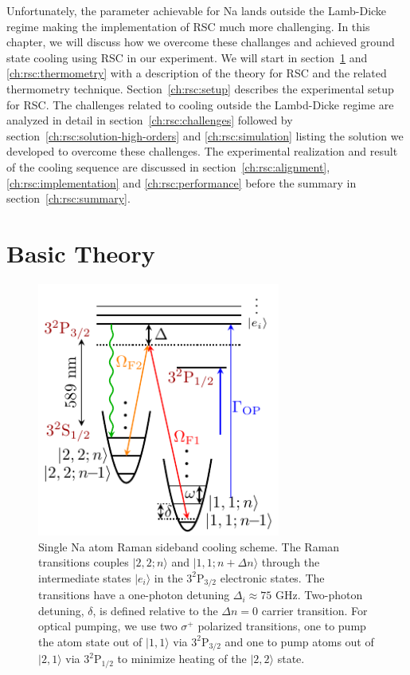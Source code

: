 Unfortunately, the parameter achievable for Na lands outside the Lamb-Dicke regime
making the implementation of RSC much more challenging.
In this chapter, we will discuss how we overcome these challanges
and achieved ground state cooling using RSC in our experiment.
We will start in section~\ref{ch:rsc:basic-theory} and \ref{ch:rsc:thermometry}
with a description of the theory for RSC and the related thermometry technique.
Section~\ref{ch:rsc:setup} describes the experimental setup for RSC.
The challenges related to cooling outside the Lambd-Dicke regime are analyzed in detail
in section~\ref{ch:rsc:challenges} followed by
section~\ref{ch:rsc:solution-high-orders} and \ref{ch:rsc:simulation}
listing the solution we developed to overcome these challenges.
The experimental realization and result of the cooling sequence
are discussed in section~\ref{ch:rsc:alignment}, \ref{ch:rsc:implementation}
and \ref{ch:rsc:performance} before the summary in section~\ref{ch:rsc:summary}.


\section{Basic Theory}
\label{ch:rsc:basic-theory}

\begin{figure}
  \centering
  \includegraphics[width=8cm]{figures/na_rsc_schematics.pdf}
  \caption[Schematics of Raman sideband cooling for Sodium.]{
    Single Na atom Raman sideband cooling scheme.
    The Raman transitions couples $|2,2;n\rangle$ and $|1,1;n+\Delta n\rangle$
    through the intermediate states $|e_i\rangle$ in the $\mathrm{3^2P_{3/2}}$ electronic states.
    The transitions have a one-photon detuning $\Delta_i\approx75$ GHz.
    Two-photon detuning, $\delta$, is defined relative to the $\Delta n=0$ carrier transition.
    For optical pumping, we use two $\sigma^+$ polarized transitions,
    one to pump the atom state out of $|1,1\rangle$ via $\mathrm{3^2P_{3/2}}$
    and one to pump atoms out of $|2,1\rangle$ via $\mathrm{3^2P_{1/2}}$
    to minimize heating of the $|2,2\rangle$ state.
    \label{fig:rsc:na-schematics}}
\end{figure}


